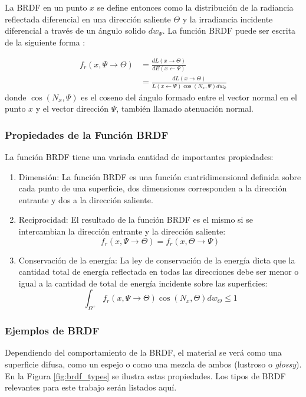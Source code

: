 La \ac{BRDF} en un punto $x$ se define entonces como la distribución de la radiancia reflectada diferencial en una dirección saliente $\Theta$ y la irradiancia incidente diferencial a través de un ángulo solido $dw_{\Psi}$. La función \ac{BRDF} puede ser escrita de la siguiente forma \cite{advanced_gi2006}:

\begin{equation}
	\begin{split}
        f_{r}(x, \Psi\to\Theta) &= \frac{dL(x\to\Theta)}{dE(x\gets\Psi)}\\
        &= \frac{dL(x\to\Theta)}{L(x\gets\Psi)\cos(N_{x}, \Psi)dw_{\Psi}}
	\end{split}
	\label{eq:brdf_def}
\end{equation} donde $\cos(N_{x}, \Psi)$ es el coseno del ángulo formado entre el vector normal en el punto $x$ y el vector dirección $\Psi$, también llamado atenuación normal.

\subsubsection{Propiedades de la Función BRDF}

La función BRDF tiene una variada cantidad de importantes propiedades:

\begin{enumerate}
	\item Dimensión: La función BRDF es una función cuatridimensional definida sobre cada punto de una superficie, dos dimensiones corresponden a la dirección entrante y dos a la dirección saliente.
	\item Reciprocidad: El resultado de la función BRDF es el mismo si se intercambian la dirección entrante y la dirección saliente:
    	\begin{equation}
            f_{r}(x, \Psi\to\Theta) = f_{r}(x, \Theta\to\Psi)
    	\end{equation}
	\item Conservación de la energía: La ley de conservación de la energía dicta que la cantidad total de energía reflectada en todas las direcciones debe ser menor o igual a la cantidad de total de energía incidente sobre las superficies: 
    	\begin{equation}
    		\int_{\Omega^{+}}f_{r}(x, \Psi\to\Theta)\cos(N_{x}, \Theta)dw_{\Theta} \leq 1
    	\end{equation}
\end{enumerate}

\subsubsection{Ejemplos de BRDF}
Dependiendo del comportamiento de la \ac{BRDF}, el material se verá como una superficie difusa, como un espejo o como una mezcla de ambos (lustroso o \emph{glossy}). En la Figura \ref{fig:brdf_types} se ilustra estas propiedades. Los tipos de BRDF relevantes para este trabajo serán listados aquí.

